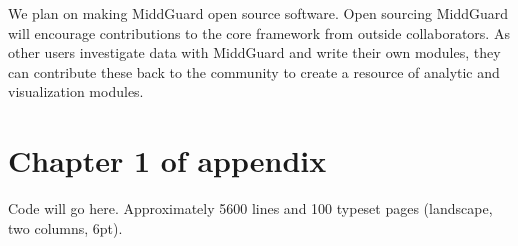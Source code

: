 \documentclass[midd]{thesis}
\begin{document}
We plan on making MiddGuard open source software. Open sourcing MiddGuard will
encourage contributions to the core framework from outside collaborators. As
other users investigate data with MiddGuard and write their own modules, they
can contribute these back to the community to create a resource of analytic and
visualization modules.

\appendix
\chapter{Chapter 1 of appendix}

Code will go here. Approximately 5600 lines and 100 typeset pages (landscape,
two columns, 6pt).


\end{document}
